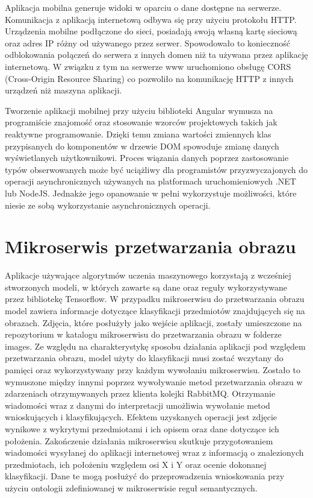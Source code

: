 {{Aplikacja mobilna generuje widoki w oparciu o dane dostępne na serwerze. Komunikacja z aplikacją internetową odbywa się przy użyciu protokołu HTTP. Urządzenia mobilne podłączone do sieci, posiadają swoją własną kartę sieciową oraz adres IP różny od używanego przez serwer. Spowodowało to konieczność odblokowania połączeń do serwera z innych domen niż ta używana przez aplikację internetową. W związku z tym na serwerze www uruchomiono obsługę CORS \cite{CORS} (Cross-Origin Resource Sharing) co pozwoliło na komunikację HTTP z innych urządzeń niż maszyna aplikacji. 

Tworzenie aplikacji mobilnej przy użyciu biblioteki Angular wymusza na programiście znajomość oraz stosowanie wzorców projektowych takich jak reaktywne programowanie. Dzięki temu zmiana wartości zmiennych klas przypisanych do komponentów w drzewie DOM spowoduje zmianę danych wyświetlanych użytkownikowi. Proces wiązania danych poprzez zastosowanie typów obserwowanych może być uciążliwy dla programistów przyzwyczajonych do operacji asynchronicznych używanych na platformach uruchomieniowych .NET lub NodeJS. Jednakże jego opanowanie w pełni wykorzystuje możliwości, które niesie ze sobą wykorzystanie asynchronicznych operacji.
}
\section{Mikroserwis przetwarzania obrazu}
{ Aplikacje używające algorytmów uczenia maszynowego korzystają z wcześniej stworzonych modeli, w których zawarte są dane oraz reguły wykorzystywane przez bibliotekę Tensorflow. W przypadku mikroserwisu do przetwarzania obrazu model zawiera informacje dotyczące klasyfikacji przedmiotów znajdujących się na obrazach. Zdjęcia, które posłużyły jako wejście aplikacji, zostały umieszczone na repozytorium w katalogu mikroserwisu do przetwarzania obrazu w folderze images. Ze względu na charakterystykę sposobu działania aplikacji pod względem przetwarzania obrazu, model użyty do klasyfikacji musi zostać wczytany do pamięci oraz wykorzystywany przy każdym wywołaniu mikroserwisu. Zostało to wymuszone między innymi poprzez wywoływanie metod przetwarzania obrazu w zdarzeniach otrzymywanych przez klienta kolejki RabbitMQ. Otrzymanie wiadomości wraz z danymi do interpretacji umożliwia wywołanie metod wnioskujących i klasyfikujących. Efektem uzyskanych operacji jest zdjęcie wynikowe z wykrytymi przedmiotami i ich opisem oraz dane dotyczące ich położenia. Zakończenie działania mikroserwisu skutkuje przygotowaniem wiadomości wysyłanej do aplikacji internetowej wraz z informacją o znalezionych przedmiotach, ich położeniu względem osi X i Y oraz ocenie dokonanej klasyfikacji. Dane te mogą posłużyć do przeprowadzenia wnioskowania przy użyciu ontologii zdefiniowanej w mikroserwisie reguł semantycznych.
}

}
